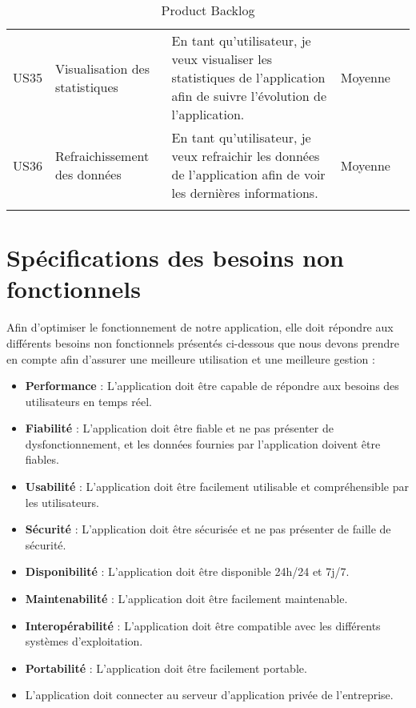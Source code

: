 \begin{landscape}
\begin{adjustwidth}{-1cm}{}
\begin{longtable}{|c|p{5cm}|p{12cm}|c|c|}
    \cline{1-4}
    US35&Visualisation des statistiques&En tant qu'utilisateur, je veux visualiser les statistiques de l'application afin de suivre l'évolution de l'application.&Moyenne&\\
    
    \cline{1-4}
    US36&Refraichissement des données&En tant qu'utilisateur, je veux refraichir les données de l'application afin de voir les dernières informations.&Moyenne&\\


    \hline
        \caption{Product Backlog}
        \label{tab:product_backlog}
      
      \end{longtable}
    \end{adjustwidth}
\end{landscape}

\section{Spécifications des besoins non fonctionnels}
Afin d'optimiser le fonctionnement de notre application, elle doit répondre aux différents besoins non fonctionnels présentés ci-dessous que nous devons prendre en compte afin d'assurer une meilleure utilisation et une meilleure gestion :

\begin{itemize}
\item \textbf{Performance} : L'application doit être capable de répondre aux besoins des utilisateurs en temps réel.
\item \textbf{Fiabilité} : L'application doit être fiable et ne pas présenter de dysfonctionnement, et les données fournies par l'application doivent être fiables.
\item \textbf{Usabilité} : L'application doit être facilement utilisable et compréhensible par les utilisateurs.
\item \textbf{Sécurité} : L'application doit être sécurisée et ne pas présenter de faille de sécurité.
\item \textbf{Disponibilité} : L'application doit être disponible 24h/24 et 7j/7.
\item \textbf{Maintenabilité} : L'application doit être facilement maintenable.
\item \textbf{Interopérabilité} : L'application doit être compatible avec les différents systèmes d'exploitation.
\item \textbf{Portabilité} : L'application doit être facilement portable.
\item L'application doit connecter au serveur d'application privée de l'entreprise.
\end{itemize}

